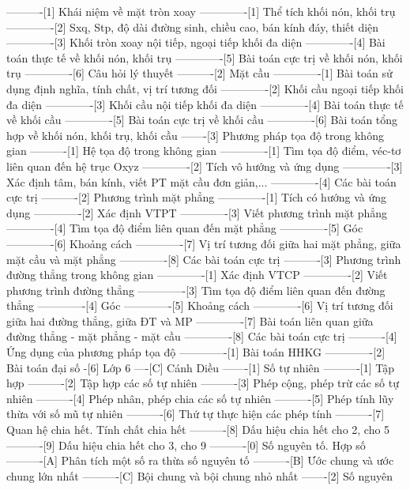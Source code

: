 ----------[1] Khái niệm về mặt tròn xoay
-------------[1] Thể tích khối nón, khối trụ
-------------[2] Sxq, Stp, độ dài đường sinh, chiều cao, bán kính đáy, thiết diện
-------------[3] Khối tròn xoay nội tiếp, ngoại tiếp khối đa diện
-------------[4] Bài toán thực tế về khối nón, khối trụ
-------------[5] Bài toán cực trị về khối nón, khối trụ
-------------[6] Câu hỏi lý thuyết
----------[2] Mặt cầu
-------------[1] Bài toán sử dụng định nghĩa, tính chất, vị trí tương đối
-------------[2] Khối cầu ngoại tiếp khối đa diện
-------------[3] Khối cầu nội tiếp khối đa diện
-------------[4] Bài toán thực tế về khối cầu
-------------[5] Bài toán cực trị về khối cầu
-------------[6] Bài toán tổng hợp về khối nón, khối trụ, khối cầu
-------[3] Phương pháp tọa độ trong không gian
----------[1] Hệ tọa độ trong không gian
-------------[1] Tìm tọa độ điểm, véc-tơ liên quan đến hệ trục Oxyz
-------------[2] Tích vô hướng và ứng dụng
-------------[3] Xác định tâm, bán kính, viết PT mặt cầu đơn giản,...
-------------[4] Các bài toán cực trị
----------[2] Phương trình mặt phẳng
-------------[1] Tích có hướng và ứng dụng
-------------[2] Xác định VTPT
-------------[3] Viết phương trình mặt phẳng
-------------[4] Tìm tọa độ điểm liên quan đến mặt phẳng
-------------[5] Góc
-------------[6] Khoảng cách
-------------[7] Vị trí tương đối giữa hai mặt phẳng, giữa mặt cầu và mặt phẳng
-------------[8] Các bài toán cực trị
----------[3] Phương trình đường thẳng trong không gian
-------------[1] Xác định VTCP
-------------[2] Viết phương trình đường thẳng
-------------[3] Tìm tọa độ điểm liên quan đến đường thẳng
-------------[4] Góc
-------------[5] Khoảng cách
-------------[6] Vị trí tương đối giữa hai đường thẳng, giữa ĐT và MP
-------------[7] Bài toán liên quan giữa đường thẳng - mặt phẳng - mặt cầu
-------------[8] Các bài toán cực trị
----------[4] Ứng dụng của phương pháp tọa độ
-------------[1] Bài toán HHKG
-------------[2] Bài toán đại số
-[6] Lớp 6
----[C] Cánh Diều
-------[1] Số tự nhiên
----------[1] Tập hợp
----------[2] Tập hợp các số tự nhiên
----------[3] Phép cộng, phép trừ các số tự nhiên
----------[4] Phép nhân, phép chia các số tự nhiên
----------[5] Phép tính lũy thừa với số mũ tự nhiên
----------[6] Thứ tự thực hiện các phép tính
----------[7] Quan hệ chia hết. Tính chất chia hết
----------[8] Dấu hiệu chia hết cho 2, cho 5
----------[9] Dấu hiệu chia hết cho 3, cho 9
----------[0] Số nguyên tố. Hợp số
----------[A] Phân tích một số ra thừa số nguyên tố
----------[B] Ước chung và ước chung lớn nhất
----------[C] Bội chung và bội chung nhỏ nhất
-------[2] Số nguyên
